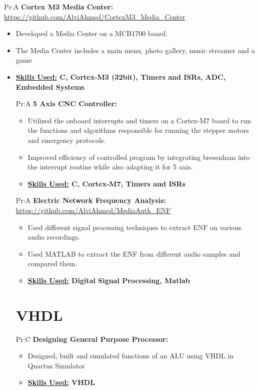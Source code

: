 Pr:A
\textbf{Cortex M3 Media Center: } 
\underline{\url{https://github.com/AlviAhmed/CortexM3_Media_Center}}
\begin{itemize}[noitemsep,nolistsep]
\item Developed a Media Center on a MCB1700 board.
\item The Media Center includes a main menu, photo gallery, music streamer and a game 
\item \textbf{ \underline{Skills Used:} C, Cortex-M3 (32bit), Timers and ISRs, ADC,
    Embedded Systems}

  
Pr:A
\textbf{5 Axis CNC Controller: } 
\begin{itemize}[noitemsep,nolistsep]
\item Utilized the onboard interrupts and timers on a Cortex-M7 board to run
  the functions and algorithms responsible for running the stepper motors and emergency protocols.
\item Improved efficiency of controlled program by integrating bresenham into the
  interrupt routine while also adapting it for 5 axis.
\item \textbf{ \underline{Skills Used:} C, Cortex-M7, Timers and ISRs}
\end{itemize}


Pr:A
\textbf{Electric Network Frequency Analysis: }
\underline{\url{https://github.com/AlviAhmed/MediaAuth_ENF}}
\begin{itemize}[noitemsep,nolistsep]
\item Used different signal processing techniques to extract ENF on various audio recordings.
\item Used MATLAB to extract the ENF from different audio samples and compared them.
\item \textbf{\underline{Skills Used:} Digital Signal Processing, Matlab}
\end{itemize}


\section*{VHDL}


Pr:C
\textbf{Designing General Purpose Processor: } 
\begin{itemize}[noitemsep,nolistsep]
\item Designed, built and simulated functions of an ALU using VHDL in Quartus Simulator
\item \textbf{ \underline{Skills Used:} VHDL}
\end{itemize}



\end{itemize}
